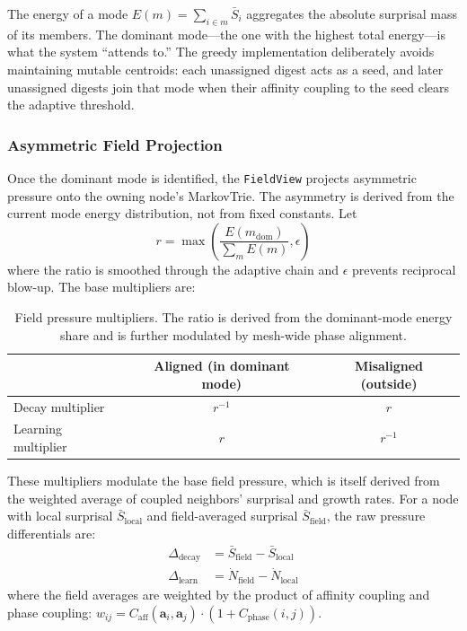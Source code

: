 The energy of a mode $E(m) = \sum_{i \in m} \bar{S}_i$ aggregates the
absolute surprisal mass of its members.  The dominant mode---the one
with the highest total energy---is what the system ``attends to.''  The
greedy implementation deliberately avoids maintaining mutable centroids:
each unassigned digest acts as a seed, and later unassigned digests join
that mode when their affinity coupling to the seed clears the adaptive
threshold.

\subsubsection{Asymmetric Field Projection}

Once the dominant mode is identified, the \texttt{FieldView} projects
asymmetric pressure onto the owning node's MarkovTrie.  The asymmetry is
derived from the current mode energy distribution, not from fixed
constants.  Let
\begin{equation}
  r = \max\!\left(\frac{E(m_{\text{dom}})}{\sum_m E(m)}, \epsilon\right)
  \label{eq:alignment_ratio}
\end{equation}
where the ratio is smoothed through the adaptive chain and $\epsilon$
prevents reciprocal blow-up.  The base multipliers are:

\begin{table}[h]
  \centering
  \caption{Field pressure multipliers.  The ratio is derived from the
           dominant-mode energy share and is further modulated by
           mesh-wide phase alignment.}
  \label{tab:field_pressure}
  \begin{tabular}{lcc}
    \toprule
    & \textbf{Aligned (in dominant mode)}
    & \textbf{Misaligned (outside)} \\
    \midrule
    Decay multiplier   & $r^{-1}$ & $r$ \\
    Learning multiplier & $r$ & $r^{-1}$ \\
    \bottomrule
  \end{tabular}
\end{table}

These multipliers modulate the base field pressure, which is itself
derived from the weighted average of coupled neighbors' surprisal and
growth rates.  For a node with local surprisal $\bar{S}_{\text{local}}$
and field-averaged surprisal $\bar{S}_{\text{field}}$, the raw pressure
differentials are:
\begin{align}
  \Delta_{\text{decay}}  &= \bar{S}_{\text{field}} - \bar{S}_{\text{local}} \\
  \Delta_{\text{learn}}  &= \dot{N}_{\text{field}} - \dot{N}_{\text{local}}
\end{align}
where the field averages are weighted by the product of affinity coupling
and phase coupling:
$w_{ij} = C_{\text{aff}}(\mathbf{a}_i, \mathbf{a}_j) \cdot
(1 + C_{\text{phase}}(i, j))$.

